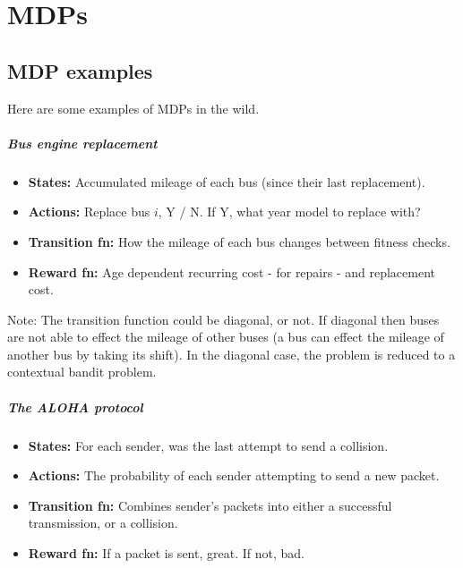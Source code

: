 \chapter{MDPs}

\section{MDP examples}\label{MDP-examples}

Here are some examples of MDPs in the wild.

\paragraph{Bus engine replacement}

\begin{itemize}
\tightlist
\item
  \textbf{States:} Accumulated mileage of each bus (since their last
  replacement).
\item
  \textbf{Actions:} Replace bus \(i\), Y / N. If Y, what year model to
  replace with?
\item
  \textbf{Transition fn:} How the mileage of each bus changes between
  fitness checks.
\item
  \textbf{Reward fn:} Age dependent recurring cost - for repairs - and
  replacement cost.
\end{itemize}

Note: The transition function could be diagonal, or not. If diagonal
then buses are not able to effect the mileage of other buses (a bus can effect the mileage of another bus by taking its shift).
In the diagonal case, the problem is reduced to a contextual bandit problem.

\cite{Putterman2015}

\hypertarget{the-aloha-protocol}{%
\paragraph{The ALOHA protocol}\label{the-aloha-protocol}}

\begin{itemize}
\tightlist
\item
  \textbf{States:} For each sender, was the last attempt to send a collision.
\item
  \textbf{Actions:} The probability of each sender attempting to send
  a new packet.
\item
  \textbf{Transition fn:} Combines sender's packets into either a
  successful transmission, or a collision.
\item
  \textbf{Reward fn:} If a packet is sent, great. If not, bad.
\end{itemize}

